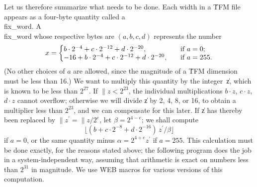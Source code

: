 Let us therefore summarize what needs to be done. Each width in a \.{TFM}
file appears as a four-byte quantity called a \\{fix\_word}.  A \\{fix\_word}
whose respective bytes are $(a,b,c,d)$ represents the number
$$x=\left\{\vcenter{\halign{$#$,\hfil\qquad&if $#$\hfil\cr
b\cdot2^{-4}+c\cdot2^{-12}+d\cdot2^{-20}&a=0;\cr
-16+b\cdot2^{-4}+c\cdot2^{-12}+d\cdot2^{-20}&a=255.\cr}}\right.$$
(No other choices of $a$ are allowed, since the magnitude of a \.{TFM}
dimension must be less than 16.)  We want to multiply this quantity by the
integer~\|z, which is known to be less than $2^{27}$.
If $\|z<2^{23}$, the individual multiplications $b\cdot z$, $c\cdot z$,
$d\cdot z$ cannot overflow; otherwise we will divide \|z by 2, 4, 8, or
16, to obtain a multiplier less than $2^{23}$, and we can compensate for
this later. If \|z has thereby been replaced by $\|z^\prime=\|z/2^e$, let
$\beta=2^{4-e}$; we shall compute
$$\lfloor(b+c\cdot2^{-8}+d\cdot2^{-16})\,z^\prime/\beta\rfloor$$ if $a=0$,
or the same quantity minus $\alpha=2^{4+e}z^\prime$ if $a=255$.
This calculation must be done exactly, for the reasons stated above; the
following program does the job in a system-independent way, assuming
that arithmetic is exact on numbers less than $2^{31}$ in magnitude. We
use \.{WEB} macros for various versions of this computation.

